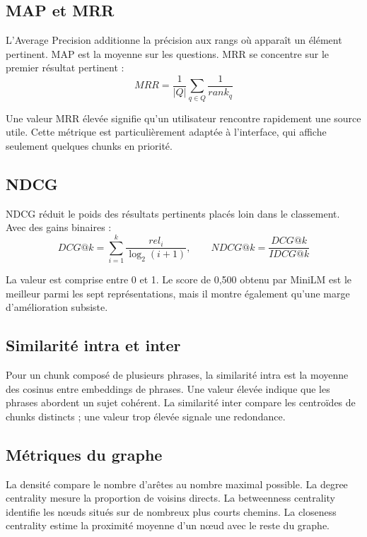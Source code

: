 \documentclass[12pt,a4paper,oneside]{report}
\begin{document}
\subsection{MAP et MRR}
L'Average Precision additionne la précision aux rangs où apparaît un élément pertinent. MAP est la moyenne sur les questions. MRR se concentre sur le premier résultat pertinent :
\begin{equation}
MRR = \frac{1}{|Q|}\sum_{q \in Q}\frac{1}{rank_q}
\end{equation}

Une valeur MRR élevée signifie qu'un utilisateur rencontre rapidement une source utile. Cette métrique est particulièrement adaptée à l'interface, qui affiche seulement quelques chunks en priorité.

\subsection{NDCG}
NDCG réduit le poids des résultats pertinents placés loin dans le classement. Avec des gains binaires :
\begin{equation}
DCG@k = \sum_{i=1}^{k}\frac{rel_i}{\log_2(i+1)}, \qquad NDCG@k = \frac{DCG@k}{IDCG@k}
\end{equation}

La valeur est comprise entre 0 et 1. Le score de 0,500 obtenu par MiniLM est le meilleur parmi les sept représentations, mais il montre également qu'une marge d'amélioration subsiste.

\subsection{Similarité intra et inter}
Pour un chunk composé de plusieurs phrases, la similarité intra est la moyenne des cosinus entre embeddings de phrases. Une valeur élevée indique que les phrases abordent un sujet cohérent. La similarité inter compare les centroïdes de chunks distincts ; une valeur trop élevée signale une redondance.

\subsection{Métriques du graphe}
La densité compare le nombre d'arêtes au nombre maximal possible. La degree centrality mesure la proportion de voisins directs. La betweenness centrality identifie les nœuds situés sur de nombreux plus courts chemins. La closeness centrality estime la proximité moyenne d'un nœud avec le reste du graphe.
\end{document}
